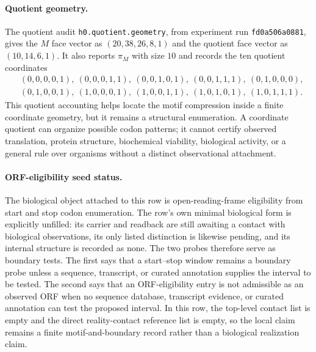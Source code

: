 \paragraph{Quotient geometry.}
The quotient audit \texttt{h0.quotient.geometry}, from experiment run \texttt{fd0a506a0881}, gives the $M$ face vector as $(20,38,26,8,1)$ and the quotient face vector as $(10,14,6,1)$.  It also reports $\pi_M$ with size $10$ and records the ten quotient coordinates
$$
\begin{aligned}
&(0,0,0,0,1),\ (0,0,0,1,1),\ (0,0,1,0,1),\ (0,0,1,1,1),\ (0,1,0,0,0),\\
&(0,1,0,0,1),\ (1,0,0,0,1),\ (1,0,0,1,1),\ (1,0,1,0,1),\ (1,0,1,1,1).
\end{aligned}
$$
This quotient accounting helps locate the motif compression inside a finite coordinate geometry, but it remains a structural enumeration.  A coordinate quotient can organize possible codon patterns; it cannot certify observed translation, protein structure, biochemical viability, biological activity, or a general rule over organisms without a distinct observational attachment.

\paragraph{ORF-eligibility seed status.}
The biological object attached to this row is open-reading-frame eligibility from start and stop codon enumeration.  The row's own minimal biological form is explicitly unfilled: its carrier and readback are still awaiting a contact with biological observations, its only listed distinction is likewise pending, and its internal structure is recorded as none.  The two probes therefore serve as boundary tests.  The first says that a start--stop window remains a boundary probe unless a sequence, transcript, or curated annotation supplies the interval to be tested.  The second says that an ORF-eligibility entry is not admissible as an observed ORF when no sequence database, transcript evidence, or curated annotation can test the proposed interval.  In this row, the top-level contact list is empty and the direct reality-contact reference list is empty, so the local claim remains a finite motif-and-boundary record rather than a biological realization claim.

